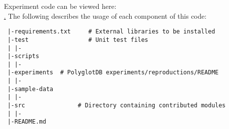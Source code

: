 \documentclass[twoside,11pt]{article}
\begin{document}
Experiment code can be viewed here: \\ \href{https://github.com/michaelhaaf/mfa-workbook}. The following describes the usage of each component of this code:

\begin{verbatim}
 |-requirements.txt     # External libraries to be installed
 |-test                 # Unit test files
 | |-
 |-scripts    
 | |-
 |-experiments  # PolyglotDB experiments/reproductions/README
 | |-
 |-sample-data
 | |-
 |-src               # Directory containing contributed modules
 | |-
 |-README.md
\end{verbatim}


% 
\end{document}
